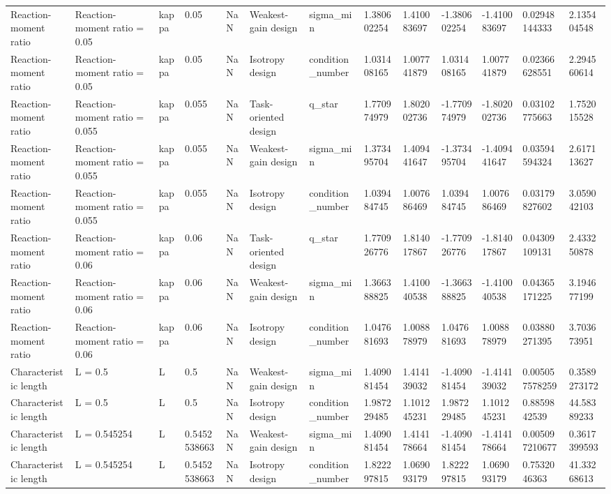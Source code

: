 \begin{tabular}{@{}lllllllllllll@{}}
Reaction-moment ratio & Reaction-moment ratio = 0.05 & kappa & 0.05 & NaN & Weakest-gain design & sigma\_min & 1.380602254 & 1.410083697 & -1.380602254 & -1.410083697 & 0.02948144333 & 2.135404548 \\
Reaction-moment ratio & Reaction-moment ratio = 0.05 & kappa & 0.05 & NaN & Isotropy design & condition\_number & 1.031408165 & 1.007741879 & 1.031408165 & 1.007741879 & 0.02366628551 & 2.294560614 \\
Reaction-moment ratio & Reaction-moment ratio = 0.055 & kappa & 0.055 & NaN & Task-oriented design & q\_star & 1.770974979 & 1.802002736 & -1.770974979 & -1.802002736 & 0.03102775663 & 1.752015528 \\
Reaction-moment ratio & Reaction-moment ratio = 0.055 & kappa & 0.055 & NaN & Weakest-gain design & sigma\_min & 1.373495704 & 1.409441647 & -1.373495704 & -1.409441647 & 0.03594594324 & 2.617113627 \\
Reaction-moment ratio & Reaction-moment ratio = 0.055 & kappa & 0.055 & NaN & Isotropy design & condition\_number & 1.039484745 & 1.007686469 & 1.039484745 & 1.007686469 & 0.03179827602 & 3.059042103 \\
Reaction-moment ratio & Reaction-moment ratio = 0.06 & kappa & 0.06 & NaN & Task-oriented design & q\_star & 1.770926776 & 1.814017867 & -1.770926776 & -1.814017867 & 0.04309109131 & 2.433250878 \\
Reaction-moment ratio & Reaction-moment ratio = 0.06 & kappa & 0.06 & NaN & Weakest-gain design & sigma\_min & 1.366388825 & 1.410040538 & -1.366388825 & -1.410040538 & 0.04365171225 & 3.194677199 \\
Reaction-moment ratio & Reaction-moment ratio = 0.06 & kappa & 0.06 & NaN & Isotropy design & condition\_number & 1.047681693 & 1.008878979 & 1.047681693 & 1.008878979 & 0.03880271395 & 3.703673951 \\
Characteristic length & L = 0.5 & L & 0.5 & NaN & Weakest-gain design & sigma\_min & 1.409081454 & 1.414139032 & -1.409081454 & -1.414139032 & 0.005057578259 & 0.3589273172 \\
Characteristic length & L = 0.5 & L & 0.5 & NaN & Isotropy design & condition\_number & 1.987229485 & 1.101245231 & 1.987229485 & 1.101245231 & 0.8859842539 & 44.58389233 \\
Characteristic length & L = 0.545254 & L & 0.5452538663 & NaN & Weakest-gain design & sigma\_min & 1.409081454 & 1.414178664 & -1.409081454 & -1.414178664 & 0.005097210677 & 0.3617399593 \\
Characteristic length & L = 0.545254 & L & 0.5452538663 & NaN & Isotropy design & condition\_number & 1.822297815 & 1.069093179 & 1.822297815 & 1.069093179 & 0.7532046363 & 41.33268613 \\

\end{tabular}
